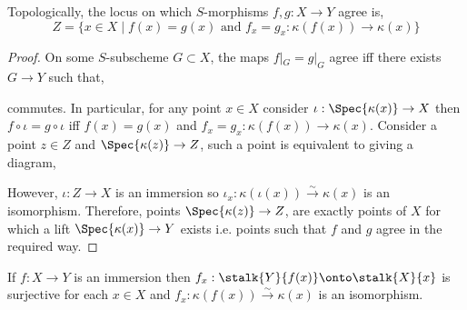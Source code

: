 \documentclass[12pt]{article}
\begin{document}
\begin{lemma}
Topologically, the locus on which $S$-morphisms $f, g : X \to Y$ agree is,
\[ Z = \{ x \in X \mid f(x) = g(x) \text{ and } f_x = g_x : \kappa(f(x)) \to \kappa(x) \} \]
\end{lemma}

\begin{proof}
On some $S$-subscheme $G \subset X$, the maps $f|_G = g|_G$ agree iff there exists $G \to Y$ such that,
\begin{center}
\end{center}
commutes. In particular, for any point $x \in X$ consider $\iota : \Spec{\kappa(x)} \to X$ then $f \circ \iota = g \circ \iota$ iff $f(x) = g(x)$ and $f_x = g_x : \kappa(f(x)) \to \kappa(x)$. Consider a point $z \in Z$ and $\Spec{\kappa(z)} \to Z$, such a point is equivalent to giving a diagram,
\begin{center}
\end{center}
However, $\iota : Z \to X$ is an immersion so $\iota_x : \kappa(\iota(x)) \xrightarrow{\sim} \kappa(x)$ is an isomorphism. Therefore, points $\Spec{\kappa(z)} \to Z$, are exactly points of $X$ for which a lift $\Spec{\kappa(x)} \to Y$ exists i.e. points such that $f$ and $g$ agree in the required way.
\end{proof}

\begin{lemma}
If $f : X \to Y$ is an immersion then $f_x : \stalk{Y}{f(x)} \onto \stalk{X}{x}$ is surjective for each $x \in X$ and $f_x : \kappa(f(x)) \xrightarrow{\sim} \kappa(x)$ is an isomorphism.
\end{lemma}
\end{document}
